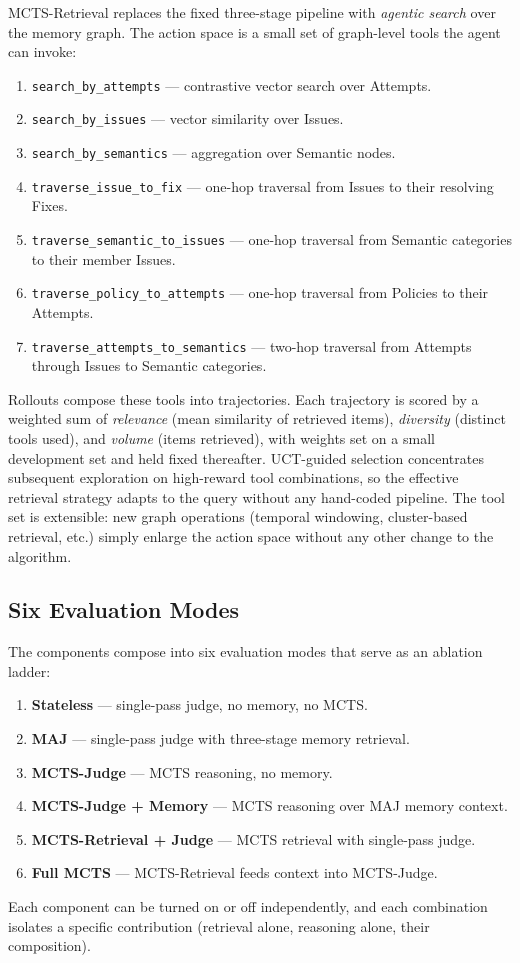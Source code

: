 \documentclass[12pt,a4paper]{report}
\begin{document}
MCTS-Retrieval replaces the fixed three-stage pipeline with \textit{agentic search} over the memory graph. The action space is a small set of graph-level tools the agent can invoke:
\begin{enumerate}
    \item \texttt{search\_by\_attempts} --- contrastive vector search over Attempts.
    \item \texttt{search\_by\_issues} --- vector similarity over Issues.
    \item \texttt{search\_by\_semantics} --- aggregation over Semantic nodes.
    \item \texttt{traverse\_issue\_to\_fix} --- one-hop traversal from Issues to their resolving Fixes.
    \item \texttt{traverse\_semantic\_to\_issues} --- one-hop traversal from Semantic categories to their member Issues.
    \item \texttt{traverse\_policy\_to\_attempts} --- one-hop traversal from Policies to their Attempts.
    \item \texttt{traverse\_attempts\_to\_semantics} --- two-hop traversal from Attempts through Issues to Semantic categories.
\end{enumerate}
Rollouts compose these tools into trajectories. Each trajectory is scored by a weighted sum of \textit{relevance} (mean similarity of retrieved items), \textit{diversity} (distinct tools used), and \textit{volume} (items retrieved), with weights set on a small development set and held fixed thereafter. UCT-guided selection concentrates subsequent exploration on high-reward tool combinations, so the effective retrieval strategy adapts to the query without any hand-coded pipeline. The tool set is extensible: new graph operations (temporal windowing, cluster-based retrieval, etc.) simply enlarge the action space without any other change to the algorithm.

\subsection{Six Evaluation Modes}

The components compose into six evaluation modes that serve as an ablation ladder:
\begin{enumerate}
    \item \textbf{Stateless} --- single-pass judge, no memory, no MCTS.
    \item \textbf{MAJ} --- single-pass judge with three-stage memory retrieval.
    \item \textbf{MCTS-Judge} --- MCTS reasoning, no memory.
    \item \textbf{MCTS-Judge + Memory} --- MCTS reasoning over MAJ memory context.
    \item \textbf{MCTS-Retrieval + Judge} --- MCTS retrieval with single-pass judge.
    \item \textbf{Full MCTS} --- MCTS-Retrieval feeds context into MCTS-Judge.
\end{enumerate}
Each component can be turned on or off independently, and each combination isolates a specific contribution (retrieval alone, reasoning alone, their composition).
\end{document}
